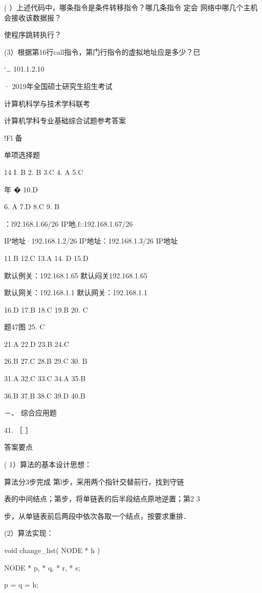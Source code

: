 {( ）上述代码中，哪条指令是条件转移指令？哪几条指令  定会    网络中哪几个主机会接收该数据报？

    使程序跳转执行？

(3）根据第16行call指令，第门行指令的虚拟地址应是多少？巳

    ‘…    101.1.2.10

    ·    2019年全国硕士研究生招生考试

    计算机科学与技术学科联考

    计算机学科专业基础综合试题参考答案


    !Fl    备

    单项选择题

    14    I. B    2. B    3.C    4. A    5.C

    年   �    10.D

    6. A    7.D    8.C    9. B

    ：l92.168.1.66/26    IP地.f::192.168.1.67/26

IP地址·192.168.1.2/26    IP地址：192.168.1.3/26   IP地址

    11.B    12.C    13.A    14. D    15.D

    默认例关：192.168.1.65    默认闷关192.168.1.65

默认网关：192.168.1.1     默认网关：192.168.1.1

    16.D    17.B    18.C    19.B    20. C

    题47图    25. C

    21.A    22.D    23.B    24.C

    26.B    27.C    28.B    29.C    30. B

    31.A    32.C    33.C    34.A    35.B

    36.B    37.B    38.C    39.D    40.B

    －、  综合应用题

    41. ［    ］

    答案要点

    ( 1）算法的基本设计思想：

    算法分3步完成  第l步，采用两个指针交替前行，找到守链

    表的中间结点；第步，将单链表的后半段结点原地逆置；第2    3

    步，从单链表前后两段中依次各取一个结点，按要求重排．

    (2）算法实现：

    void change_list( NODE * h )

    NODE * p,  * q,  * r,  * s;

    p = q = h;

}
